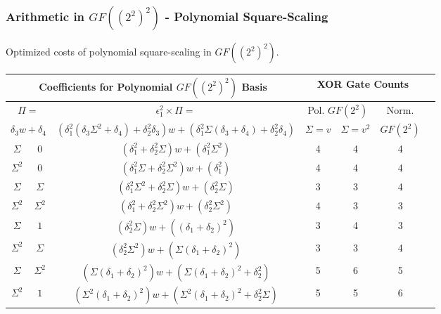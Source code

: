 \documentclass[10pt]{beamer}
\begin{document}
\begin{frame}
	\frametitle{Arithmetic in $GF((2^2)^2)$ - Polynomial Square-Scaling}
	Optimized costs of polynomial square-scaling in $GF((2^2)^2)$.
\begin{table}[ht!]
\centering
\scriptsize
	\begin{tabular}{|c|c|c|c|c|c|c|} \hline
		\multicolumn{3}{|c|}{Coefficients for Polynomial $GF((2^2)^2)$ Basis} & \multicolumn{3}{c|}{XOR Gate Counts} \\ \hline
		\multicolumn{2}{|c}{$\Pi = $} & \multicolumn{1}{|c|}{$\epsilon_1^2 \times \Pi = $} & \multicolumn{2}{|c|}{Pol. $GF(2^2)$} & \multicolumn{1}{c|}{Norm.} \\
		\multicolumn{2}{|c|}{$\delta_3 w + \delta_4$} & \multicolumn{1}{c}{$(\delta_1^2(\delta_3\Sigma^2 + \delta_4) + \delta_2^2\delta_3) w + (\delta_1^2\Sigma(\delta_3 + \delta_4) + \delta_2^2\delta_4)$} & \multicolumn{1}{|c|}{$\Sigma = v$} & \multicolumn{1}{|c|}{$\Sigma = v^2$} & \multicolumn{1}{|c|}{$GF(2^2)$} \\ \hline

		$\Sigma$ & $0$          & $(\delta_1^2 + \delta_2^2\Sigma)w + (\delta_1^2\Sigma^2)$                    & 4 & 4 & 4 \\
		$\Sigma^2$ & $0$        & $(\delta_1^2\Sigma + \delta_2^2\Sigma^2)w + (\delta_1^2)$                    & 4 & 4 & 4  \\
		$\Sigma$ & $\Sigma$     & $(\delta_1^2\Sigma^2 + \delta_2^2\Sigma)w + (\delta_2^2\Sigma)$              & 3 & 3 & 4  \\
		$\Sigma^2$ & $\Sigma^2$ & $(\delta_1^2 + \delta_2^2\Sigma^2)w + (\delta_2^2\Sigma^2)$                  & 4 & 3 & 3  \\
		$\Sigma$ & $1$          & $(\delta_2^2\Sigma)w + ((\delta_1 + \delta_2)^2)$                            & 3 & 4 & 3  \\
		$\Sigma^2$ & $\Sigma$   & $(\delta_2^2\Sigma^2)w + (\Sigma(\delta_1 + \delta_2)^2)$                    & 3 & 3 & 4  \\
		$\Sigma$ & $\Sigma^2$   & $(\Sigma(\delta_1 + \delta_2)^2)w + (\Sigma(\delta_1 + \delta_2)^2 + \delta_2^2)$ & 5 & 6 & 5  \\
		$\Sigma^2$ & $1$        & $(\Sigma^2(\delta_1 + \delta_2)^2)w + (\Sigma^2(\delta_1 + \delta_2)^2 + \delta_2^2\Sigma)$ & 5 & 5 & 6 \\ \hline
    \end{tabular}
\end{table}
\end{frame}
\end{document}
